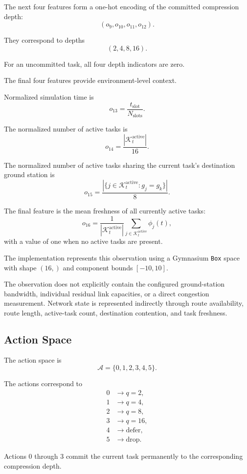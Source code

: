 \documentclass[11pt]{article}
\begin{document}
The next four features form a one-hot encoding of the committed compression
depth:
\[
(o_9,o_{10},o_{11},o_{12}).
\]

They correspond to depths
\[
(2,4,8,16).
\]

For an uncommitted task, all four depth indicators are zero.

The final four features provide environment-level context.

Normalized simulation time is
\[
o_{13}
=
\frac{t_{\mathrm{slot}}}{N_{\mathrm{slots}}}.
\]

The normalized number of active tasks is
\[
o_{14}
=
\frac{|\mathcal{K}^{\mathrm{active}}_t|}{16}.
\]

The normalized number of active tasks sharing the current task's destination
ground station is
\[
o_{15}
=
\frac{
|\{j\in\mathcal{K}^{\mathrm{active}}_t:g_j=g_k\}|
}{8}.
\]

The final feature is the mean freshness of all currently active tasks:
\[
o_{16}
=
\frac{1}{|\mathcal{K}^{\mathrm{active}}_t|}
\sum_{j\in\mathcal{K}^{\mathrm{active}}_t}
\phi_j(t),
\]
with a value of one when no active tasks are present.

The implementation represents this observation using a Gymnasium
\texttt{Box} space with shape $(16,)$ and component bounds $[-10,10]$.

The observation does not explicitly contain the configured ground-station
bandwidth, individual residual link capacities, or a direct congestion
measurement. Network state is represented indirectly through route
availability, route length, active-task count, destination contention, and
task freshness.


\subsection{Action Space}

The action space is
\[
\mathcal{A}=\{0,1,2,3,4,5\}.
\]

The actions correspond to
\[
\begin{aligned}
0 &\rightarrow q=2,\\
1 &\rightarrow q=4,\\
2 &\rightarrow q=8,\\
3 &\rightarrow q=16,\\
4 &\rightarrow \text{defer},\\
5 &\rightarrow \text{drop}.
\end{aligned}
\]

Actions 0 through 3 commit the current task permanently to the corresponding
compression depth.
\end{document}
